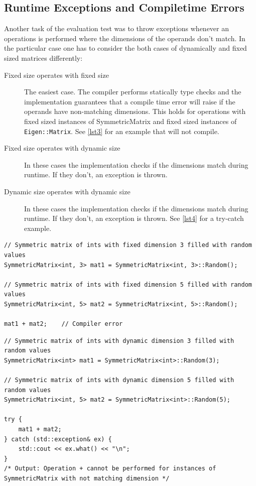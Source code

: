 \documentclass[a4wide]{scrartcl}
\begin{document}
\subsection{Runtime Exceptions and Compiletime Errors}
Another task of the evaluation test was to throw exceptions whenever an operations is performed where the dimensions of the operands don't match. In the particular case one has to consider the both cases of dynamically and fixed sized matrices differently:\newline
\begin{description}
\item[Fixed size operates with fixed size] The easiest case. The compiler performs statically type checks and the implementation guarantees that a compile time error will raise if the operands have non-matching dimensions. This holds for operations with fixed sized instances of SymmetricMatrix and fixed sized instances of \texttt{Eigen::Matrix}. See \autoref{lst3} for an example that will not compile.
\item[Fixed size operates with dynamic size] In these cases the implementation checks if the dimensions match during runtime. If they don't, an exception is thrown.
\item[Dynamic size operates with dynamic size] In these cases the implementation checks if the dimensions match during runtime. If they don't, an exception is thrown. See \autoref{lst4} for a try-catch example.
\end{description}
\begin{table}
\begin{lstlisting}[caption={Addition of matrices with different fixed size. This example will not compile.},label=lst3]
// Symmetric matrix of ints with fixed dimension 3 filled with random values
SymmetricMatrix<int, 3> mat1 = SymmetricMatrix<int, 3>::Random();

// Symmetric matrix of ints with fixed dimension 5 filled with random values
SymmetricMatrix<int, 5> mat2 = SymmetricMatrix<int, 5>::Random();

mat1 + mat2;    // Compiler error
\end{lstlisting}
\end{table}
\begin{table}
\begin{lstlisting}[caption={Addition of matrices with different dynamic size.},label=lst4]
// Symmetric matrix of ints with dynamic dimension 3 filled with random values
SymmetricMatrix<int> mat1 = SymmetricMatrix<int>::Random(3);

// Symmetric matrix of ints with dynamic dimension 5 filled with random values
SymmetricMatrix<int, 5> mat2 = SymmetricMatrix<int>::Random(5);

try {
    mat1 + mat2;
} catch (std::exception& ex) {
    std::cout << ex.what() << "\n";     
}
/* Output: Operation + cannot be performed for instances of SymmetricMatrix with not matching dimension */
\end{lstlisting}
\end{table}
\end{document}
